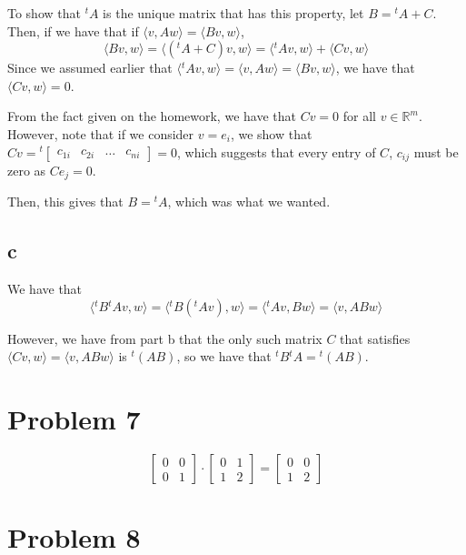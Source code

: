 \documentclass[12pt,letterpaper]{article}
\theoremstyle{definition}
\newcommand{\R}{\mathbb{R}}
\begin{document}
To show that $^tA$ is the unique matrix that has this property, let $B = {^tA} +
C$. Then, if we have that if $\langle v, Aw \rangle = \langle Bv, w \rangle$,
\[
  \langle Bv, w \rangle = \langle ({^tA} + C)v, w \rangle
                        = \langle {^tA}v, w \rangle + \langle Cv, w \rangle
\]
Since we assumed earlier that $\langle {^tA}v, w \rangle = \langle v, Aw
\rangle = \langle Bv, w \rangle$, we have that $\langle Cv, w \rangle = 0$. 

From the fact given on the homework, we have that $Cv = 0$ for all $v \in \R^m$.
However, note that if we consider $v = e_i$, we show that $Cv =
{^t\begin{bmatrix}c_{1i} & c_{2i} & \dots & c_{ni} \end{bmatrix}} = 0$, which
suggests that every entry of $C$, $c_{ij}$ must be zero as $Ce_j = 0$.

Then, this gives that $B = {^t A}$, which was what we wanted.

\subsection*{c}

We have that
\[
  \langle {^tB}{^tA}v, w \rangle = \langle {^tB}({^tA}v), w \rangle = \langle
  {^tA}v, Bw \rangle = \langle v, ABw \rangle
\]

However, we have from part b that the only such matrix $C$ that satisfies
$\langle Cv, w \rangle = \langle v, ABw \rangle$ is $^t(AB)$, so we have that
${^tB}{^tA} = {^t(AB)}$.

\section*{Problem 7}

\[
  \begin{bmatrix}
    0 & 0 \\
    0 & 1
  \end{bmatrix} \cdot
  \begin{bmatrix}
    0 & 1\\
    1 & 2
  \end{bmatrix} =
  \begin{bmatrix}
    0 & 0 \\
    1 & 2
  \end{bmatrix}
\]

\section*{Problem 8}
\end{document}
